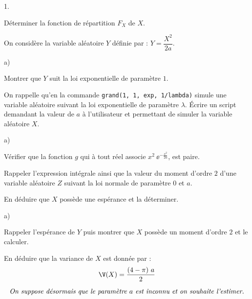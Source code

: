 \begin{noliste}{1.}
  \setcounter{enumi}{1} %
  \setlength{\itemsep}{4mm}
\item Déterminer la fonction de répartition $F_X$ de $X$.

  

\item On considère la variable aléatoire $Y$ définie par : $Y =
  \dfrac{X^2}{2a}$.
  \begin{noliste}{a)}
    \setlength{\itemsep}{2mm}
  \item Montrer que $Y$ suit la loi exponentielle de paramètre $1$.

    
    
  \item On rappelle qu'en \Scilab{} la commande {\tt grand(1, 1,
      \ttq{}exp\ttq{}, 1/lambda)} simule une variable aléatoire
    suivant la loi exponentielle de paramètre $\lambda$. Écrire un
    script \Scilab{} demandant la valeur de $a$ à l'utilisateur et
    permettant de simuler la variable aléatoire $X$.
    
    
  \end{noliste}




\item  
  \begin{noliste}{a)}
    \setlength{\itemsep}{2mm}
  \item Vérifier que la fonction $g$ qui à tout réel associe $x^2 \
    \ee^{- \frac{x^2}{2a}}$, est paire.

    

  \item Rappeler l'expression intégrale ainsi que la valeur du moment
    d'ordre $2$ d'une variable aléatoire $Z$ suivant la loi normale de
    paramètre $0$ et $a$.

    

  \item En déduire que $X$ possède une espérance et la déterminer.

    
  \end{noliste}

\item 
  \begin{noliste}{a)}
    \setlength{\itemsep}{2mm}
  \item Rappeler l'espérance de $Y$ puis montrer que $X$ possède un
    moment d'ordre $2$ et le calculer.

    

  \item En déduire que la variance de $X$ est donnée par :
    \[
    \V(X) = \dfrac{(4 - \pi) \ a}{2}
    \]

    
  \end{noliste}
\end{noliste}
\[
\mbox{\it On suppose désormais que le paramètre $a$ est inconnu et on
  souhaite l'estimer.}
\]


